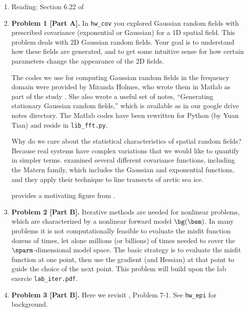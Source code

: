 \documentclass[11pt,titlepage,fleqn]{article}
\begin{document}
\begin{enumerate}
\item Reading: Section 6.22 of \citet{Tarantola2005}

\item {\bf Problem 1 [Part A].} In \verb+hw_cov+ you explored Gaussian random fields with prescribed covariance (exponential or Gaussian) for a 1D spatial field. This problem deals with 2D Gaussian random fields. Your goal is to understand how these fields are generated, and to get some intuitive sense for how certain parameters change the appearance of the 2D fields.

The codes we use for computing Gaussian random fields in the frequency domain were provided by Miranda Holmes, who wrote them in Matlab as part of the study \citet{BuhlerHolmes2009}. She also wrote a useful set of notes, ``Generating stationary Gaussian random fields,'' which is available as in our google drive notes directory. The Matlab codes have been rewritten for Python (by Yuan Tian) and reside in \verb+lib_fft.py+.

Why do we care about the statistical characteristics of spatial random fields? Because real systems have complex variations that we would like to quantify in simpler terms. \citet{Gneiting2012} examined several different covariance functions, including the Matern family, which includes the Gaussian and exponential functions, and they apply their technique to line transects of arctic sea ice.

 provides a motivating figure from \citet{Tarantola2005}.

\item {\bf Problem 2 [Part B].} Iterative methods are needed for nonlinear problems, which are characterized by a nonlinear forward model $\bg(\bem)$. In many problems it is not computationally feasible to evaluate the misfit function dozens of times, let alone millions (or billions) of times needed to cover the $\nparm$-dimensional model space. The basic strategy is to evaluate the misfit function at one point, then use the gradient (and Hessian) at that point to guide the choice of the next point. This problem will build upon the lab exercie \verb+lab_iter.pdf+.

\item {\bf Problem 3 [Part B].} Here we revisit \citet{Tarantola2005}, Problem 7-1. See \verb+hw_epi+ for background.

\end{enumerate}
\end{document}
